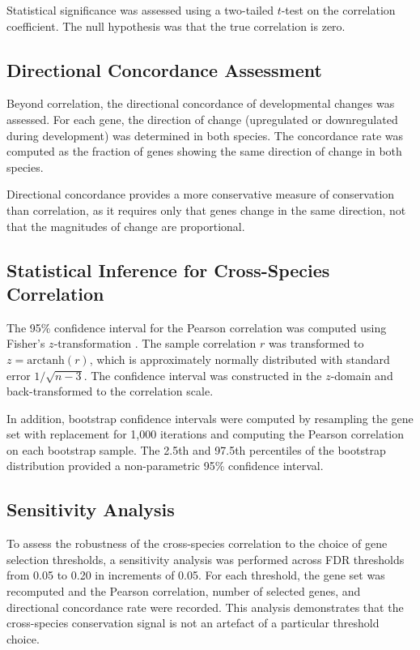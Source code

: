 Statistical significance was assessed using a two-tailed $t$-test on the correlation coefficient. The null hypothesis was that the true correlation is zero.

\subsection{Directional Concordance Assessment}

Beyond correlation, the directional concordance of developmental changes was assessed. For each gene, the direction of change (upregulated or downregulated during development) was determined in both species. The concordance rate was computed as the fraction of genes showing the same direction of change in both species.

Directional concordance provides a more conservative measure of conservation than correlation, as it requires only that genes change in the same direction, not that the magnitudes of change are proportional.

\subsection{Statistical Inference for Cross-Species Correlation}

The 95\% confidence interval for the Pearson correlation was computed using Fisher's $z$-transformation \parencite{fisher_014_nodate}. The sample correlation $r$ was transformed to $z = \text{arctanh}(r)$, which is approximately normally distributed with standard error $1/\sqrt{n-3}$. The confidence interval was constructed in the $z$-domain and back-transformed to the correlation scale.

In addition, bootstrap confidence intervals were computed by resampling the gene set with replacement for 1,000 iterations and computing the Pearson correlation on each bootstrap sample. The 2.5th and 97.5th percentiles of the bootstrap distribution provided a non-parametric 95\% confidence interval.

\subsection{Sensitivity Analysis}

To assess the robustness of the cross-species correlation to the choice of gene selection thresholds, a sensitivity analysis was performed across FDR thresholds from 0.05 to 0.20 in increments of 0.05. For each threshold, the gene set was recomputed and the Pearson correlation, number of selected genes, and directional concordance rate were recorded. This analysis demonstrates that the cross-species conservation signal is not an artefact of a particular threshold choice.


